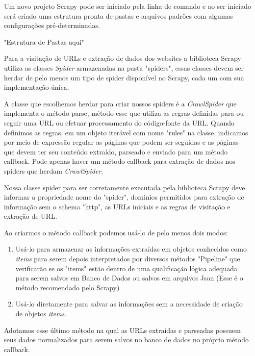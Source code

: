 \documentclass[12pt]{article}
\begin{document}
Um novo projeto Scrapy pode ser iniciado pela linha de comando e ao ser iniciado será criado uma estrutura pronta de pastas e arquivos padrões com algumas configurações pré-determinadas.
 
"Estrutura de Pastas aqui"

Para a visitação de URLs e extração de dados dos websites a biblioteca Scrapy utiliza as classes \textit{Spider} armazenadas na pasta "spiders", essas classes devem ser herdar de pelo menos um tipo de spider disponível no Scrapy, cada um com sua implementação única.

A classe que escolhemos herdar para criar nossos spiders é a \textit{CrawlSpider} que implementa o método parse, método esse que utiliza as regras definidas para ou seguir uma URL ou efetuar processamento do código-fonte da URL. Quando definimos as regras, em um objeto iterável com nome "rules" na classe, indicamos por meio de expressão regular as páginas que podem ser seguidas e as páginas que devem ter seu conteúdo extraído, parseado e enviado para um método callback. Pode apenas haver um método callback para extração de dados nos spiders que herdam \textit{CrawlSpider}.

Nossa classe spider para ser corretamente executada pela biblioteca Scrapy deve informar a propriedade nome do "spider", dominios permitidos para extração de informação sem o schema "http", as URLs iniciais e as regras de visitação e extração de URL.

Ao criarmos o método callback podemos usá-lo de pelo menos dois modos: 

\begin{enumerate}
\item Usá-lo para armazenar as informações extraídas em objetos conhecidos como \textit{items} para serem depois interpretados por diversos métodos "Pipeline" que verificarão se os "items" estão dentro de uma qualificação lógica adequada para serem salvos em Banco de Dados ou salvos em arquivos Json (Esse é o método recomendado pelo Scrapy)
\item Usá-lo diretamente para salvar as informações sem a necessidade de criação de objetos \textit{items}.
\end{enumerate}

Adotamos esse último método na qual as URLs extraídas e parseadas possuem seus dados normalizados para serem salvos no banco de dados no próprio método callback.
  
 
\end{document}
